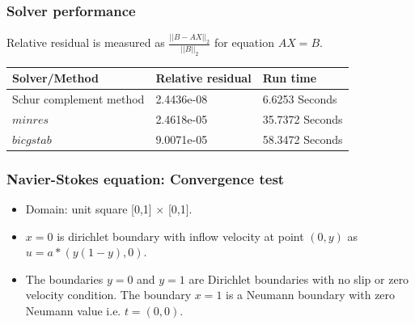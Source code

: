 \documentclass{beamer}
\begin{document}
\begin{frame}
\frametitle{Solver performance}

Relative residual is measured as $\frac{||B-AX||_2}{||B||_2}$ for equation $AX=B$.

\begin{longtable}{| p{} | p{} | p{} |}
\hline
\textbf{Solver/Method} & \textbf{Relative residual} & \textbf{Run time}\\
\hline
Schur complement method & 2.4436e-08 & 6.6253 Seconds\\
\hline
$minres$ & 2.4618e-05 & 35.7372 Seconds\\
\hline
$bicgstab$ & 9.0071e-05 & 58.3472 Seconds\\
\hline
\end{longtable}

\end{frame}
\begin{frame}
\frametitle{Navier-Stokes equation: Convergence test}
\begin{itemize}
\item Domain: unit square [0,1] $\times$ [0,1].
\item ${x=0}$ is dirichlet boundary with inflow velocity at point $(0,y)$ as $u = a*(y(1-y), 0)$.
\item The boundaries ${y = 0}$ and ${y = 1}$ are Dirichlet boundaries with no slip or zero velocity condition. The boundary ${x = 1}$ is a Neumann boundary with zero Neumann value i.e. $t = (0, 0)$. 
\end{itemize}
\end{frame}
\end{document}
